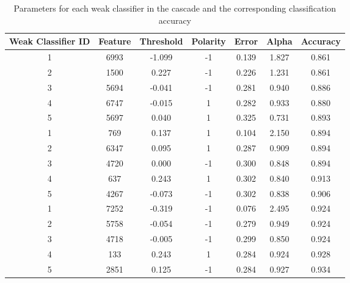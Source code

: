 \documentclass{article}
\begin{document}
\begin{table}[H]
    \centering
    \begin{tabular}{|c|c|c|c|c|c|c|}
        \hline
        \textbf{Weak Classifier ID} & \textbf{Feature} & \textbf{Threshold} & \textbf{Polarity} & \textbf{Error} & \textbf{Alpha} & \textbf{Accuracy} \\ \hline
        1 & 6993 & -1.099 & -1 & 0.139 & 1.827 & 0.861 \\ 
        2 & 1500 & 0.227 & -1 & 0.226 & 1.231 & 0.861 \\ 
        3 & 5694 & -0.041 & -1 & 0.281 & 0.940 & 0.886 \\ 
        4 & 6747 & -0.015 & 1 & 0.282 & 0.933 & 0.880 \\ 
        5 & 5697 & 0.040 & 1 & 0.325 & 0.731 & 0.893 \\ \hline
        1 & 769 & 0.137 & 1 & 0.104 & 2.150 & 0.894 \\ 
        2 & 6347 & 0.095 & 1 & 0.287 & 0.909 & 0.894 \\ 
        3 & 4720 & 0.000 & -1 & 0.300 & 0.848 & 0.894 \\ 
        4 & 637 & 0.243 & 1 & 0.302 & 0.840 & 0.913 \\ 
        5 & 4267 & -0.073 & -1 & 0.302 & 0.838 & 0.906 \\ \hline
        1 & 7252 & -0.319 & -1 & 0.076 & 2.495 & 0.924 \\ 
        2 & 5758 & -0.054 & -1 & 0.279 & 0.949 & 0.924 \\ 
        3 & 4718 & -0.005 & -1 & 0.299 & 0.850 & 0.924 \\ 
        4 & 133 & 0.243 & 1 & 0.284 & 0.924 & 0.928 \\ 
        5 & 2851 & 0.125 & -1 & 0.284 & 0.927 & 0.934 \\ \hline
    \end{tabular}
    \caption{Parameters for each weak classifier in the cascade and the corresponding classification accuracy}
\end{table}
\end{document}
